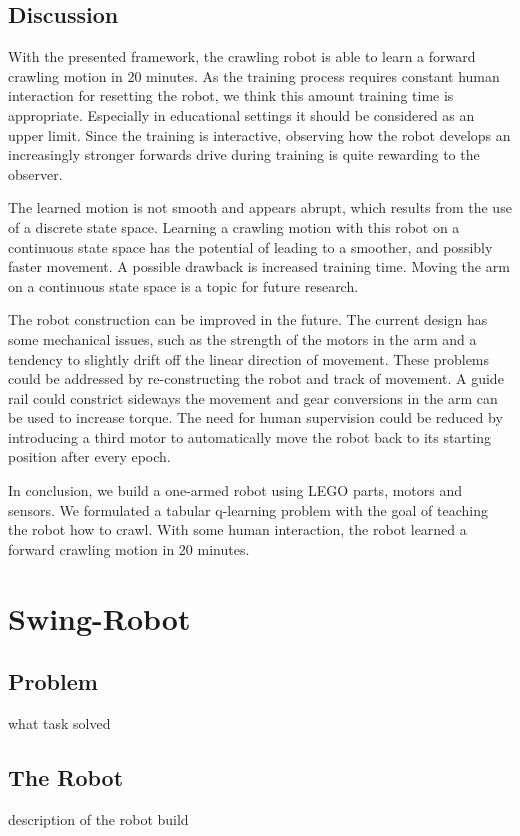 \documentclass[11pt, a4paper]{article}
\begin{document}
\subsection{Discussion}
With the presented framework, the crawling robot is able to learn a forward crawling motion in 20 minutes. As the training process requires constant human interaction for resetting the robot, we think this amount training time is appropriate. Especially in educational settings it should be considered as an upper limit. Since the training is interactive, observing how the robot develops an increasingly stronger forwards drive during training is quite rewarding to the observer. 

The learned motion is not smooth and appears abrupt, which results from the use of a discrete state space. Learning a crawling motion with this robot on a continuous state space has the potential of leading to a smoother, and possibly faster movement. A possible drawback is increased training time. Moving the arm on a continuous state space is a topic for future research.

The robot construction can be improved in the future. The current design has some mechanical issues, such as the strength of the motors in the arm and a tendency to slightly drift off the linear direction of movement. These problems could be addressed by re-constructing the robot and track of movement. A guide rail could constrict sideways the movement and gear conversions in the arm can be used to increase torque. The need for human supervision could be reduced by introducing a third motor to automatically move the robot back to its starting position after every epoch.

\medskip
In conclusion, we build a one-armed robot using LEGO parts, motors and sensors. We formulated a tabular q-learning problem with the goal of teaching the robot how to crawl. With some human interaction, the robot learned a forward crawling motion in 20 minutes. 




\pagebreak
\section{Swing-Robot}
\subsection{Problem}
what task solved
\subsection{The Robot}
description of the robot build
\end{document}
